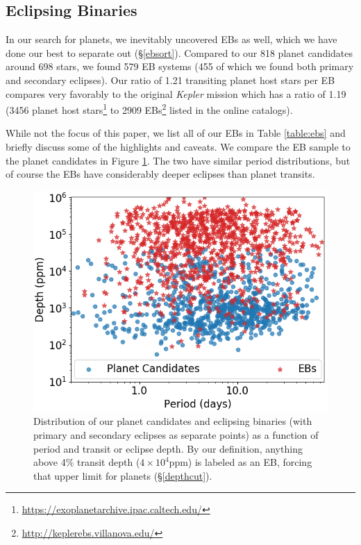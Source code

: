 \documentclass[twocolumn]{aastex62}
\newcommand{\project}[1]{\textsl{#1}}
\newcommand{\nplanet}{818}
\newcommand{\nplanethost}{698}
\newcommand{\nebs}{579}
\newcommand{\ndoubleebs}{455}
\newcommand{\planettoeb}{1.21}
\begin{document}
\subsection{Eclipsing Binaries}
\label{sec:ebs}

In our search for planets, we inevitably uncovered EBs as well, which
we have done our best to separate out (\S\ref{ebsort}). Compared to
our \nplanet{} planet candidates around \nplanethost{} stars, we found
\nebs{} EB systems (\ndoubleebs{} of which we found both primary and
secondary eclipses). Our ratio of \planettoeb{} transiting planet host
stars per EB compares very favorably to the original \project{Kepler}
mission which has a ratio of 1.19 (3456 planet host
stars\footnote{\url{https://exoplanetarchive.ipac.caltech.edu/}} to
2909 EBs\footnote{\url{http://keplerebs.villanova.edu/}} \citep{kir16}
listed in the online catalogs).

While not the focus of this paper, we list all of our EBs in Table
\ref{table:ebs} and briefly discuss some of the highlights and
caveats. We compare the EB sample to the planet candidates in Figure
\ref{ebdist}. The two have similar period distributions, but of course
the EBs have considerably deeper eclipses than planet transits.

\begin{figure}[tbp]
\includegraphics[width=\columnwidth]{ebdist.png}
\caption{Distribution of our planet candidates and eclipsing binaries
  (with primary and secondary eclipses as separate points) as a
  function of period and transit or eclipse depth. By our definition,
  anything above 4\% transit depth ($4\times10^4$ppm) is labeled as an
  EB, forcing that upper limit for planets
  (\S\ref{depthcut}). \label{ebdist}}
\end{figure}
\end{document}

